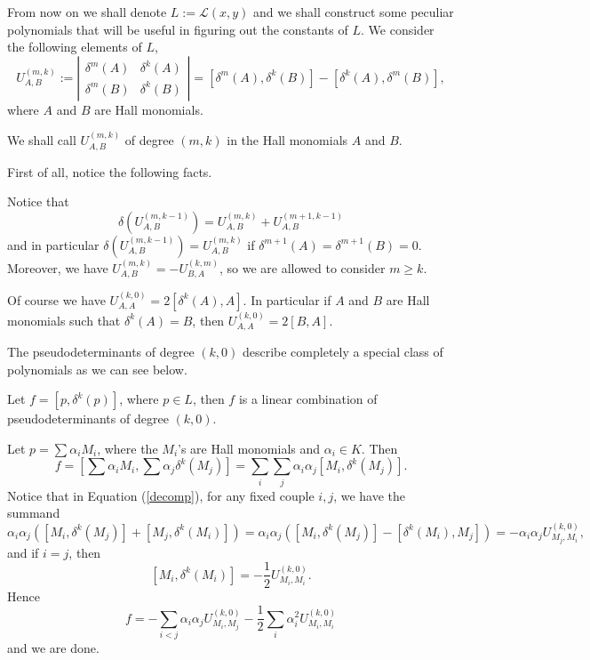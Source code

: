 \documentclass{cimart}
\begin{document}
From now on we shall denote $L:=\mathcal{L}(x,y)$ and we shall construct some peculiar polynomials that will be useful in figuring out the constants of $L$.
We consider the following elements of $L$, \[U^{(m,k)}_{A,B}:=
\left|
\begin{array}{cc}
\delta^m(A) & \delta^{k}(A)\\
\delta^m(B) & \delta^{k}(B)	
\end{array}
\right|
=[\delta^m(A),\delta^{k}(B)]-[\delta^{k}(A),\delta^m(B)],\] where $A$ and $B$ are Hall monomials.

\begin{definition}
We shall call $U^{(m,k)}_{A,B}$  of degree $(m,k)$ in the Hall monomials $A$ and $B$.
\end{definition} 

First of all, notice the following facts.

\begin{remark}\label{good}
Notice that
\[
\delta(U^{(m,k-1)}_{A,B})=U^{(m,k)}_{A,B}+U^{(m+1,k-1)}_{A,B}
\]
and in particular
$\delta(U^{(m,k-1)}_{A,B})=U^{(m,k)}_{A,B}$ if $\delta^{m+1}(A)=\delta^{m+1}(B)=0$. Moreover, we have $U^{(m,k)}_{A,B}=-U^{(k,m)}_{B,A}$, so we are allowed to consider $m\geq k$.

\end{remark}

\begin{remark}\label{import}
Of course we have $U^{(k,0)}_{A, A} = 2[\delta^k(A), A]$. In particular  if $A$ and $B$ are Hall monomials such that $\delta^k(A)=B$,
then $U^{(k,0)}_{A,A}=2[B,A]$. 
\end{remark}

The pseudodeterminants of degree $(k,0)$ describe completely a special class of polynomials as we can see below.

\begin{proposition}\label{lemma3.4}
Let $f=[p,\delta^k(p)]$, where $p\in L$, then $f$ is a linear combination of pseudodeterminants of degree $(k,0)$.
\end{proposition}
\proof
Let $p=\sum\alpha_iM_i$, where the $M_i$'s are Hall monomials and $\alpha_i \in K$. Then \begin{equation}\label{decomp}
    f=\left[\sum\alpha_iM_i,\sum\alpha_j\delta^k(M_j)\right]=\sum_i\sum_j\alpha_i\alpha_j[M_i,\delta^k(M_j)].
\end{equation} Notice that in Equation (\ref{decomp}), for any fixed couple $i,j$, we have the summand \[\alpha_i\alpha_j([M_i,\delta^k(M_j)]+[M_j,\delta^k(M_i)])=\alpha_i\alpha_j([M_i,\delta^k(M_j)]-[\delta^k(M_i),M_j])=-\alpha_i\alpha_jU^{(k,0)}_{M_j,M_i},\] and if $i=j$, then \[[M_i,\delta^k(M_i)]=-\frac{1}{2}U_{M_i,M_i}^{(k,0)}.\] Hence \[f=-\sum_{i<j}\alpha_i\alpha_jU^{(k,0)}_{M_i,M_j}-\frac{1}{2}\sum_i\alpha_i^2U_{M_i,M_i}^{(k,0)}\] and we are done.
\endproof
\end{document}
